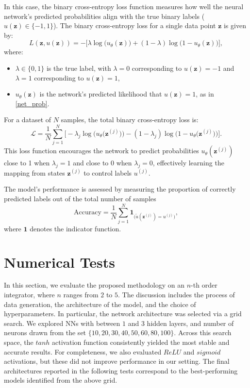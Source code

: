 \documentclass[11pt]{amsart}
\theoremstyle{definition}
\theoremstyle{remark}
\numberwithin{equation}{section}
\begin{document}
In this case, the binary cross-entropy loss function measures how well the neural network's predicted probabilities align with the true binary labels ($u(\bm{z}) \in \{-1, 1\}$). The binary cross-entropy loss for a single data point $\bm{z}$ is given by:
\begin{equation*}
L(\bm{z}, u(\bm{z})) = - \big[ \lambda \log\bigl(u_\theta(\bm{z})\bigr) + (1 - \lambda) \log\bigl(1 - u_\theta(\bm{z})\bigr) \big], 
\end{equation*}
where:
\begin{itemize}[itemsep=0.1cm,topsep=0.1cm]
 \renewcommand{\labelitemi}{\tiny{$\blacksquare$}}
 \item $\lambda \in \{0, 1\}$ is the true label, with $\lambda = 0$ corresponding to $u(\bm{z}) = -1$ and $\lambda = 1$ corresponding to $u(\bm{z}) = 1$,
 \item $u_\theta(\bm{z})$ is the network's predicted likelihood that $u(\bm{z})=1$, as in \eqref{net_prob}.
\end{itemize}

For a dataset of $N$ samples, the total binary cross-entropy loss is:
\begin{equation}\label{eq:loss}
 \mathcal{L} = \frac{1}{N} \sum_{j=1}^N \bigl[ -\lambda_j \log\bigl(u_\theta\bigl(\bm{z}^{(j)}\bigr)\bigr) - (1 - \lambda_j) \log\bigl(1 - u_\theta\bigl(\bm{z}^{(j)}\bigr)\bigr) \bigr].
\end{equation}
This loss function encourages the network to predict probabilities $u_\theta(\bm{z}^{(j)})$ close to 1 when $\lambda_j = 1$ and close to 0 when $\lambda_j = 0$, effectively learning the mapping from states $\bm{z}^{(j)}$ to control labels $u^{(j)}$.

The model's performance is assessed by measuring the proportion of correctly predicted labels out of the total number of samples 
\begin{equation*}
\text{Accuracy} = \frac{1}{N} \sum_{j=1}^N \bm{1}_{\bigl(\tilde{u}(\bm{z}^{(j)})=u^{(j)}\bigr)},
\end{equation*}
where $\bm{1}$ denotes the indicator function.


\section{Numerical Tests}\label{numtests}
In this section, we evaluate the proposed methodology on an {$n$-th} order integrator, where $n$ ranges from $2$ to $5$. The discussion includes the process of data generation, the architecture of the model, and the choice of hyperparameters. In particular, the network architecture was selected via a grid search. We explored NNs with between \(1\) and \(3\) hidden layers, and number of neurons drawn from the set \(\{10,20,30,40,50,60,80,100\}\). Across this search space, the \(tanh\) activation function consistently yielded the most stable and accurate results. For completeness, we also evaluated $ReLU$ and $sigmoid$ activations, but these did not improve performance in our setting. The final architectures reported in the following tests correspond to the best-performing models identified from the above grid.  
\end{document}
